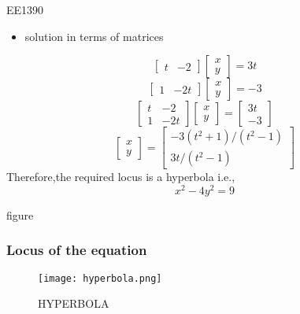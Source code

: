 \documentclass[]{beamer}
\begin{document}
\begin{frame}{EE1390}
\begin{itemize}
    \item solution in terms of matrices
\end{itemize}
\[\begin{bmatrix}
t&-2
\end{bmatrix}
\begin{bmatrix}
x\\y
\end{bmatrix}
=3t\]
\[\begin{bmatrix}
1&-2t
\end{bmatrix}
\begin{bmatrix}
x\\y
\end{bmatrix}
=-3\]
\[\begin{bmatrix}
t&-2\\1&-2t
\end{bmatrix}
\begin{bmatrix}
x\\y
\end{bmatrix}
=
\begin{bmatrix}
3t\\-3
\end{bmatrix}\]
\[\begin{bmatrix}
x\\y
\end{bmatrix}
=
\begin{bmatrix}
-3(t^2+1)/(t^2-1)\\3t/(t^2-1)
\end{bmatrix}\]
Therefore,the required locus is a hyperbola i.e.,
\begin{equation}
     x^2-4y^2=9
\end{equation}
\end{frame}
\begin{frame}{figure}
 \frametitle{Locus of the equation}
\begin{figure}
    \centering
    \texttt{[image: hyperbola.png]}
    \caption{HYPERBOLA}
\end{figure}
\end{frame}
\end{document}

